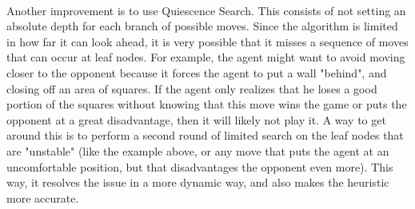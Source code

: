 \documentclass[12pt,a4paper]{article}
\begin{document}
\paragraph{} Another improvement is to use Quiescence Search. This consists of
not setting an absolute depth for each branch of possible moves. 
Since the algorithm is limited in how far it can look ahead, it is very possible that it misses 
a sequence of moves that can occur at leaf nodes. For example, the agent might want to avoid moving closer 
to the opponent because it forces the agent to put a wall "behind", and closing off an area of squares. 
If the agent only realizes that he loses a good portion of the squares without knowing that this move  
wins the game or puts the opponent at a great disadvantage, then it will likely not play it. 
A way to get around this is to perform a second round 
of limited search on the leaf nodes that are "unstable" (like the example above, or any move that puts 
the agent at an uncomfortable position, but that disadvantages the opponent even more). This way, 
it resolves the issue in a more dynamic way, and also makes the heuristic more accurate. 
\end{document}
